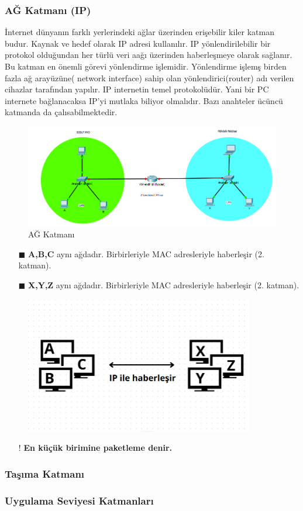 \subsubsection{AĞ Katmanı (IP) }
İnternet dünyanın farklı yerlerindeki ağlar üzerinden erişebilir kiler katman budur.
Kaynak ve hedef olarak IP adresi kullanılır.
IP yönlendirilebilir bir protokol olduğundan her türlü veri aağı üzerinden haberleşmeye olarak sağlanır.
Bu katman en önemli görevi yönlendirme işlemidir.
Yönlendirme işlemş birden fazla ağ arayüzüne( network interface) sahip olan yönlendirici(router) adı verilen cihazlar tarafından yapılır.
IP internetin temel protokolüdür.
Yani bir PC internete bağlanacaksa IP'yi mutlaka biliyor olmalıdır.
	Bazı anahteler ücüncü katmanda da çalısabilmektedir.
\begin{figure}[!ht]
	\includegraphics[width=15cm]{images/ip_katman}
	\caption{AĞ Katmanı}
	\label{fig:exemple_for_network_model}
\end{figure}
\begin{enumerate}
	\item[$\blacksquare$] \textbf{A,B,C} aynı ağdadır. Birbirleriyle MAC  adresleriyle haberleşir (2. katman).
	\item[$\blacksquare$] \textbf{X,Y,Z} aynı ağdadır. Birbirleriyle MAC  adresleriyle haberleşir (2. katman).
\end{enumerate}
\begin{figure}[!ht]
	\centering
	\includegraphics[width=10cm]{images/ip_communication}
	\label{fig:exemple_for_ip_communication}
\end{figure}
\begin{enumerate}
	\item[!] \textbf{En küçük birimine paketleme denir.}
\end{enumerate}
\subsubsection{Taşıma Katmanı}

\subsubsection{Uygulama Seviyesi Katmanları}

